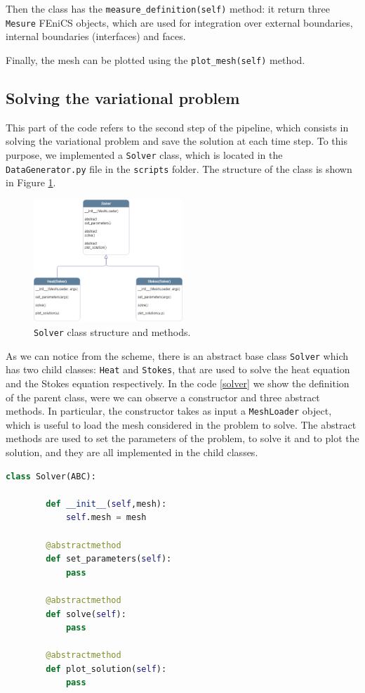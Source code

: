 \documentclass[11pt,a4paper]{article}
\begin{document}
Then the class has the \texttt{measure\_definition(self)} method: it return three \texttt{Mesure} FEniCS objects, which are used for integration over external boundaries, internal boundaries (interfaces) and faces. 

Finally, the mesh can be plotted using the \texttt{plot\_mesh(self)} method.

\subsection{Solving the variational problem}

This part of the code refers to the second step of the pipeline, which consists in solving the variational problem and save the solution at each time step.
To this purpose, we implemented a \texttt{Solver} class, which is located in the \texttt{DataGenerator.py} file in the \texttt{scripts} folder. The structure of the class is shown in Figure \ref{solver_class}. 

\begin{figure}[H]
    \centering
    \includegraphics[width=0.5\textwidth]{Images/solver_class.png}
    \caption{\texttt{Solver} class structure and methods.}
    \label{solver_class}
\end{figure}

As we can notice from the scheme, there is an abstract base class \texttt{Solver} which has two child classes: \texttt{Heat} and \texttt{Stokes}, that are used to solve the heat equation and the Stokes equation respectively. 
In the code \ref{solver} we show the definition of the parent class, were we can observe a constructor and three abstract methods. In particular, the constructor takes as input a \texttt{MeshLoader} object, which is useful to load the mesh considered in the problem to solve. The abstract methods are used to set the parameters of the problem, to solve it and to plot the solution, and they are all implemented in the child classes.

\begin{lstlisting}[language=Python, caption={Solver abstract class.}, label={solver}]
    class Solver(ABC):
    
        def __init__(self,mesh):
            self.mesh = mesh

        @abstractmethod 
        def set_parameters(self):
            pass 

        @abstractmethod 
        def solve(self):
            pass 

        @abstractmethod 
        def plot_solution(self):
            pass
\end{lstlisting}
\end{document}
